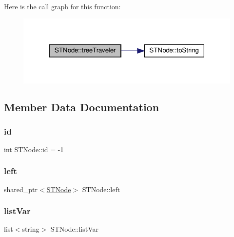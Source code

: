 Here is the call graph for this function\+:\nopagebreak
\begin{figure}[H]
\begin{center}
\leavevmode
\includegraphics[width=318pt]{d0/d75/class_s_t_node_a1850972d568af9275b19b828522df434_cgraph}
\end{center}
\end{figure}


\subsection{Member Data Documentation}
\mbox{\label{class_s_t_node_ad8a92733e77010b8aaac8ab0f82405f1}} 
\subsubsection{\texorpdfstring{id}{id}}
{\footnotesize\ttfamily int S\+T\+Node\+::id = -\/1\hspace{0.3cm}{\ttfamily [private]}}

\mbox{\label{class_s_t_node_a19ba8bab4660bdeee0e897687b451a8b}} 
\subsubsection{\texorpdfstring{left}{left}}
{\footnotesize\ttfamily shared\+\_\+ptr$<$\hyperlink{class_s_t_node}{S\+T\+Node}$>$ S\+T\+Node\+::left}

\mbox{\label{class_s_t_node_ac6db937d531b08614534af47cee8dace}} 
\subsubsection{\texorpdfstring{list\+Var}{listVar}}
{\footnotesize\ttfamily list$<$string$>$ S\+T\+Node\+::list\+Var}

